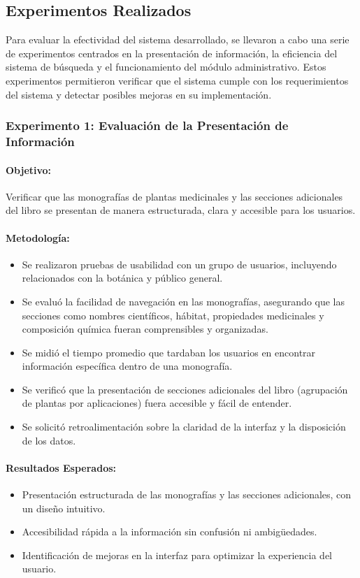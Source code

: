 \subsection{Experimentos Realizados}
Para evaluar la efectividad del sistema desarrollado, se llevaron a cabo una serie de experimentos centrados en la presentación 
de información, la eficiencia del sistema de búsqueda y el funcionamiento del módulo administrativo. Estos experimentos permitieron 
verificar que el sistema cumple con los requerimientos del sistema y detectar posibles mejoras en su implementación.

\subsubsection*{Experimento 1: Evaluación de la Presentación de Información}
\paragraph{Objetivo:}
Verificar que las monografías de plantas medicinales y las secciones adicionales del libro se presentan de manera estructurada, 
clara y accesible para los usuarios.
\paragraph{Metodología:}
\begin{itemize}
    \item Se realizaron pruebas de usabilidad con un grupo de usuarios, incluyendo relacionados con la botánica y público general.
    \item Se evaluó la facilidad de navegación en las monografías, asegurando que las secciones como nombres científicos, hábitat, 
    propiedades medicinales y composición química fueran comprensibles y organizadas.
    \item Se midió el tiempo promedio que tardaban los usuarios en encontrar información específica dentro de una monografía.
    \item Se verificó que la presentación de secciones adicionales del libro (agrupación de plantas por aplicaciones) fuera 
    accesible y fácil de entender.
    \item Se solicitó retroalimentación sobre la claridad de la interfaz y la disposición de los datos.
\end{itemize}
\paragraph{Resultados Esperados:}
\begin{itemize}
    \item Presentación estructurada de las monografías y las secciones adicionales, con un diseño intuitivo.
    \item Accesibilidad rápida a la información sin confusión ni ambigüedades.
    \item Identificación de mejoras en la interfaz para optimizar la experiencia del usuario.
\end{itemize}

